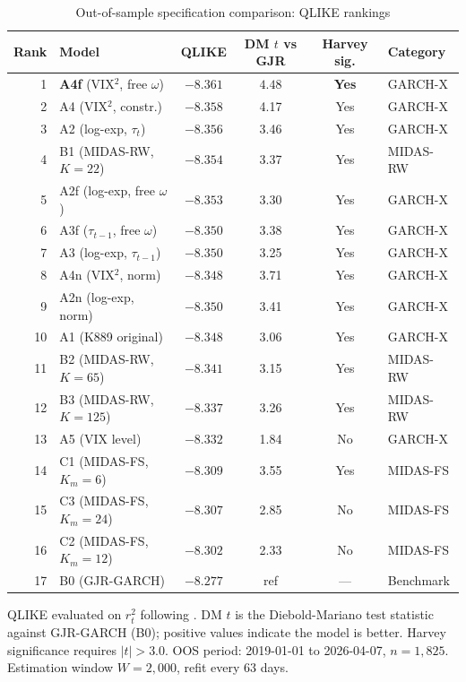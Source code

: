 \documentclass[12pt,a4paper]{article}
\begin{document}
\begin{table}[H]
\centering
\caption{Out-of-sample specification comparison: QLIKE rankings}
\label{tab:main_results}
\begin{threeparttable}
\small
\begin{tabular}{@{}rlcccl@{}}
\toprule
Rank & Model & QLIKE & DM $t$ vs GJR & Harvey sig. & Category \\
\midrule
1  & \textbf{A4f} (VIX$^2$, free $\omega$) & $\mathbf{-8.361}$ & $\mathbf{4.48}$ & \textbf{Yes} & GARCH-X \\
2  & A4 (VIX$^2$, constr.) & $-8.358$ & 4.17 & Yes & GARCH-X \\
3  & A2 (log-exp, $\tau_t$) & $-8.356$ & 3.46 & Yes & GARCH-X \\
4  & B1 (MIDAS-RW, $K\!=\!22$) & $-8.354$ & 3.37 & Yes & MIDAS-RW \\
5  & A2f (log-exp, free $\omega$) & $-8.353$ & 3.30 & Yes & GARCH-X \\
6  & A3f ($\tau_{t-1}$, free $\omega$) & $-8.350$ & 3.38 & Yes & GARCH-X \\
7  & A3 (log-exp, $\tau_{t-1}$) & $-8.350$ & 3.25 & Yes & GARCH-X \\
8  & A4n (VIX$^2$, norm) & $-8.348$ & 3.71 & Yes & GARCH-X \\
9  & A2n (log-exp, norm) & $-8.350$ & 3.41 & Yes & GARCH-X \\
10 & A1 (K889 original) & $-8.348$ & 3.06 & Yes & GARCH-X \\
11 & B2 (MIDAS-RW, $K\!=\!65$) & $-8.341$ & 3.15 & Yes & MIDAS-RW \\
12 & B3 (MIDAS-RW, $K\!=\!125$) & $-8.337$ & 3.26 & Yes & MIDAS-RW \\
13 & A5 (VIX level) & $-8.332$ & 1.84 & No & GARCH-X \\
14 & C1 (MIDAS-FS, $K_m\!=\!6$) & $-8.309$ & 3.55 & Yes & MIDAS-FS \\
15 & C3 (MIDAS-FS, $K_m\!=\!24$) & $-8.307$ & 2.85 & No & MIDAS-FS \\
16 & C2 (MIDAS-FS, $K_m\!=\!12$) & $-8.302$ & 2.33 & No & MIDAS-FS \\
17 & B0 (GJR-GARCH) & $-8.277$ & ref & --- & Benchmark \\
\bottomrule
\end{tabular}
\begin{tablenotes}
\footnotesize
\item QLIKE evaluated on $r_t^2$ following \citet{patton2011}. DM $t$ is the Diebold-Mariano test statistic against GJR-GARCH (B0); positive values indicate the model is better. Harvey significance requires $|t| > 3.0$. OOS period: 2019-01-01 to 2026-04-07, $n = 1{,}825$. Estimation window $W = 2{,}000$, refit every 63 days.
\end{tablenotes}
\end{threeparttable}
\end{table}
\end{document}
